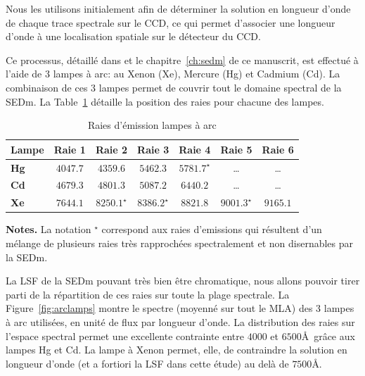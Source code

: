 \documentclass[../main/main.tex]{subfiles}
\begin{document}
Nous les utilisons initialement afin de déterminer la solution en longueur
d'onde de chaque trace spectrale sur le CCD, ce qui permet d'associer une longueur d'onde à une localisation spatiale
sur le détecteur du CCD.

Ce processus, détaillé dans \citet{pysedm} et le chapitre~\ref{ch:sedm}
de ce manuscrit, est effectué à l'aide de $3$ lampes à arc: au Xenon (Xe),
Mercure (Hg) et Cadmium (Cd). La combinaison de ces $3$ lampes permet de
couvrir tout le domaine spectral de la SEDm. La
Table~\ref{tab:linearclamp} détaille la position des raies pour chacune
des lampes.

\begin{table}[ht]
  \centerfloat
  \renewcommand{\arraystretch}{1.5}
    \begin{threeparttable}
        \caption{Raies d'émission lampes à arc}
        \label{tab:linearclamp}
        
        \begin{tabular}{lcccccc}
        \toprule
          \textbf{Lampe} &  Raie 1 &  Raie 2 & Raie 3 & Raie 4 & Raie 5 & Raie 6 \\
        \midrule
          \textbf{Hg} & $4047.7$  &  $4359.6$  &  $5462.3$  &  $5781.7^{\star}$  &  \ldots  & \ldots \\
          \textbf{Cd} & $4679.3$  & $4801.3$   & $5087.2$   & $6440.2$ &  \ldots  &  \ldots  \\
          \textbf{Xe} & $7644.1$  & $8250.1^{\star}$  & $8386.2^{\star}$  & $8821.8$  &  $9001.3^{\star}$  &  $9165.1$ \\
          \bottomrule
        \end{tabular}
        \begin{tablenotes}[flushleft]
        \item \textbf{Notes.} La notation $ ^{\star}$ correspond aux
          raies d'emissions qui résultent d'un mélange de plusieurs raies très
          rapprochées spectralement et non disernables par la SEDm.
        \end{tablenotes}
    \end{threeparttable}
  \end{table}

La LSF de la SEDm pouvant très bien être chromatique, nous allons
pouvoir tirer parti de la répartition de ces raies sur toute la plage
spectrale. La Figure~\ref{fig:arclamps} montre le spectre (moyenné sur
tout le MLA) des $3$ lampes à arc utilisées, en unité de flux par
longueur d'onde. La distribution des raies sur l'espace spectral permet
une excellente contrainte entre $4000$ et $6500$\AA\ grâce aux lampes Hg et
Cd. La lampe à Xenon permet, elle, de contraindre la solution en longueur
d'onde (et a fortiori la LSF dans cette étude) au delà de $7500$\AA.
\end{document}
